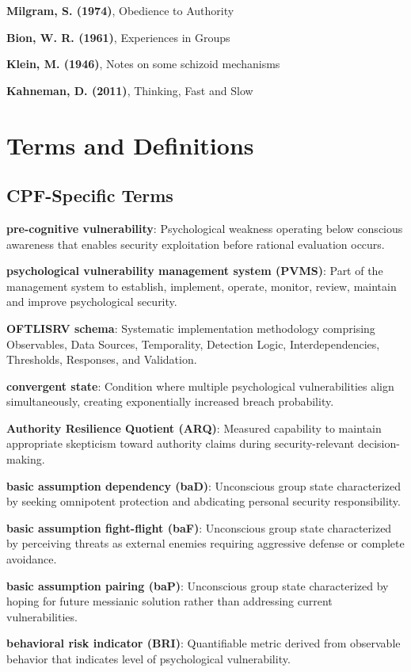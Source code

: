 \documentclass[11pt,a4paper]{article}
\begin{document}
\textbf{Milgram, S. (1974)}, Obedience to Authority

\textbf{Bion, W. R. (1961)}, Experiences in Groups

\textbf{Klein, M. (1946)}, Notes on some schizoid mechanisms

\textbf{Kahneman, D. (2011)}, Thinking, Fast and Slow

\section{Terms and Definitions}

\subsection{CPF-Specific Terms}

\textbf{pre-cognitive vulnerability}: Psychological weakness operating below conscious awareness that enables security exploitation before rational evaluation occurs.

\textbf{psychological vulnerability management system (PVMS)}: Part of the management system to establish, implement, operate, monitor, review, maintain and improve psychological security.

\textbf{OFTLISRV schema}: Systematic implementation methodology comprising Observables, Data Sources, Temporality, Detection Logic, Interdependencies, Thresholds, Responses, and Validation.

\textbf{convergent state}: Condition where multiple psychological vulnerabilities align simultaneously, creating exponentially increased breach probability.

\textbf{Authority Resilience Quotient (ARQ)}: Measured capability to maintain appropriate skepticism toward authority claims during security-relevant decision-making.

\textbf{basic assumption dependency (baD)}: Unconscious group state characterized by seeking omnipotent protection and abdicating personal security responsibility.

\textbf{basic assumption fight-flight (baF)}: Unconscious group state characterized by perceiving threats as external enemies requiring aggressive defense or complete avoidance.

\textbf{basic assumption pairing (baP)}: Unconscious group state characterized by hoping for future messianic solution rather than addressing current vulnerabilities.

\textbf{behavioral risk indicator (BRI)}: Quantifiable metric derived from observable behavior that indicates level of psychological vulnerability.
\end{document}

